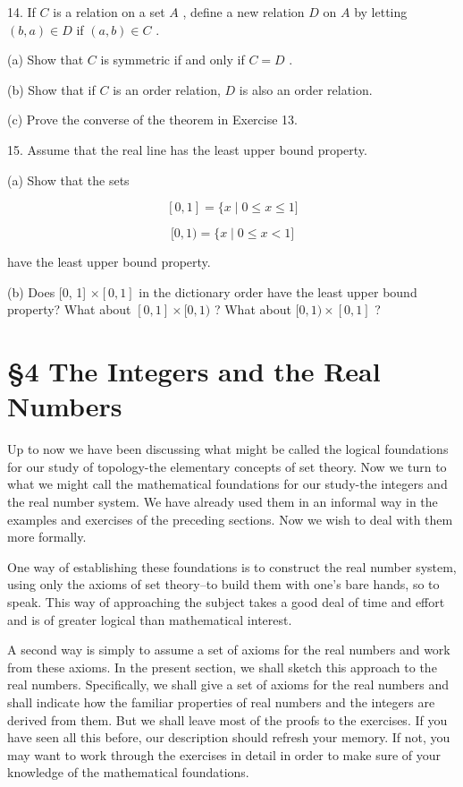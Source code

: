 \documentclass[10pt]{article}
\begin{document}
14. If \(C\) is a relation on a set \(A\) , define a new relation \(D\) on \(A\) by letting \(\left( {b,a}\right)  \in  D\) if \(\left( {a,b}\right)  \in  C\) .

(a) Show that \(C\) is symmetric if and only if \(C = D\) .

(b) Show that if \(C\) is an order relation, \(D\) is also an order relation.

(c) Prove the converse of the theorem in Exercise 13.

15. Assume that the real line has the least upper bound property.

(a) Show that the sets

\[
\left\lbrack  {0,1}\right\rbrack   = \{ x \mid  0 \leq  x \leq  1\rbrack
\]

\[
\lbrack 0,1) = \{ x \mid  0 \leq  x < 1\rbrack
\]

have the least upper bound property.

(b) Does [0, 1] \(\times  \left\lbrack  {0,1}\right\rbrack\) in the dictionary order have the least upper bound property? What about \(\left\lbrack  {0,1}\right\rbrack   \times  \lbrack 0,1)\) ? What about \(\lbrack 0,1) \times  \left\lbrack  {0,1}\right\rbrack\) ?

\section*{§4 The Integers and the Real Numbers}

Up to now we have been discussing what might be called the logical foundations for our study of topology-the elementary concepts of set theory. Now we turn to what we might call the mathematical foundations for our study-the integers and the real number system. We have already used them in an informal way in the examples and exercises of the preceding sections. Now we wish to deal with them more formally.

One way of establishing these foundations is to construct the real number system, using only the axioms of set theory--to build them with one's bare hands, so to speak. This way of approaching the subject takes a good deal of time and effort and is of greater logical than mathematical interest.

A second way is simply to assume a set of axioms for the real numbers and work from these axioms. In the present section, we shall sketch this approach to the real numbers. Specifically, we shall give a set of axioms for the real numbers and shall indicate how the familiar properties of real numbers and the integers are derived from them. But we shall leave most of the proofs to the exercises. If you have seen all this before, our description should refresh your memory. If not, you may want to work through the exercises in detail in order to make sure of your knowledge of the mathematical foundations.
\end{document}

